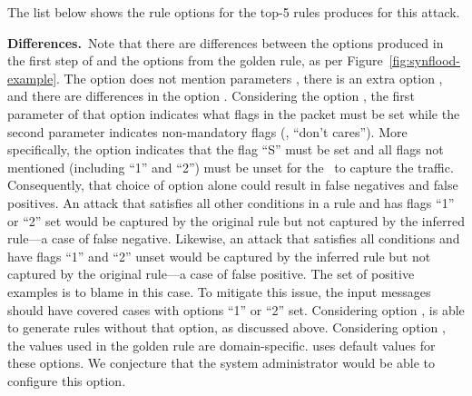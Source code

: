 \documentclass[sigconf,review, anonymous]{acmart}
\begin{document}
 The list below shows the rule options for the top-5 rules
\tname{} produces for this attack. 

\vspace{1ex}
\noindent
\textbf{Differences.}~Note that there are differences between the
options produced in the first step of \tname{} and the options from
the golden rule, as per Figure~\ref{fig:synflood-example}. The option
 does not mention parameters , there is an
extra option , and there are differences in the option
. Considering the option , the first
parameter of that option indicates what flags in the packet must be
set while the second parameter indicates non-mandatory flags (\ie{},
``don't cares''). More specifically, the option 
indicates that the flag ``S'' must be set and all flags not mentioned
(including ``1'' and ``2'') must be unset for the \nids\ to capture
the traffic. Consequently, that choice of option alone could result in
false negatives and false positives. An attack that satisfies all
other conditions in a rule and has flags ``1'' or ``2'' set would be
captured by the original rule but not captured by the inferred rule---a case of
false negative. Likewise, an attack that satisfies all conditions and
have flags ``1'' and ``2'' unset would be captured by the inferred
rule but not captured by the original rule---a case of false positive. The set of
positive examples is to blame in this case. To mitigate this issue,
the input messages should have covered cases with options ``1'' or
``2'' set. Considering option , \tname{} is able
to generate rules without that option, as discussed above. Considering
option , the values used in the golden rule are
domain-specific. \tname{} uses default values for these options. We
conjecture that the system administrator would be able to configure
this option.
\end{document}
